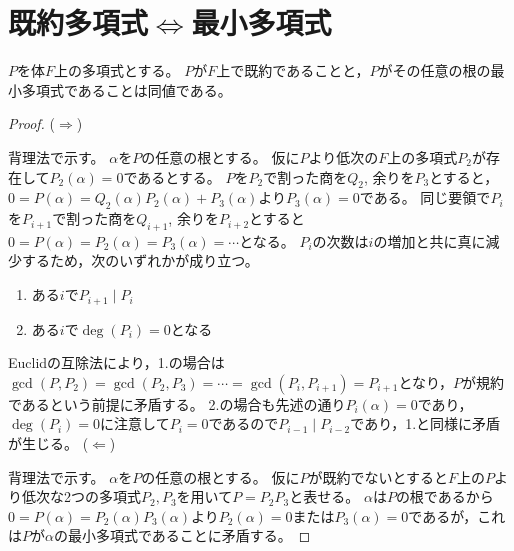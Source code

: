     \section{既約多項式\texorpdfstring{$\iff$}{⇔}最小多項式}
        \begin{shadebox}
            $P$を体$F$上の多項式とする。
            $P$が$F$上で既約であることと，$P$がその任意の根の最小多項式であることは同値である。
        \end{shadebox}
        \begin{proof}
            \quad\newline\noindent
            ($\Rightarrow$)
            \par
            背理法で示す。
            $\alpha$を$P$の任意の根とする。
            仮に$P$より低次の$F$上の多項式$P_2$が存在して$P_2(\alpha)=0$であるとする。
            $P$を$P_2$で割った商を$Q_2$, 余りを$P_3$とすると，$0 = P(\alpha) = Q_2(\alpha)P_2(\alpha) + P_3(\alpha)$より$P_3(\alpha) = 0$である。
            同じ要領で$P_i$を$P_{i+1}$で割った商を$Q_{i+1}$, 余りを$P_{i+2}$とすると$0 = P(\alpha) = P_2(\alpha) = P_3(\alpha) = \dotsb$となる。
            $P_i$の次数は$i$の増加と共に真に減少するため，次のいずれかが成り立つ。
            \begin{enumerate}
                \item ある$i$で$P_{i+1} \mid P_i$
                \item ある$i$で$\deg(P_i)=0$となる
            \end{enumerate}
            Euclidの互除法により，1.の場合は$\gcd(P,P_2) = \gcd(P_2,P_3) = \dotsb = \gcd(P_i,P_{i+1}) = P_{i+1}$となり，$P$が規約であるという前提に矛盾する。
            2.の場合も先述の通り$P_i(\alpha)=0$であり，$\deg(P_i)=0$に注意して$P_i=0$であるので$P_{i-1} \mid P_{i-2}$であり，1.と同様に矛盾が生じる。
            \newline\newline
            ($\Leftarrow$)
            \par
            背理法で示す。
            $\alpha$を$P$の任意の根とする。
            仮に$P$が既約でないとすると$F$上の$P$より低次な2つの多項式$P_2,P_3$を用いて$P=P_2P_3$と表せる。
            $\alpha$は$P$の根であるから$0 = P(\alpha) = P_2(\alpha)P_3(\alpha)$より$P_2(\alpha) = 0$または$P_3(\alpha) = 0$であるが，これは$P$が$\alpha$の最小多項式であることに矛盾する。
        \end{proof}